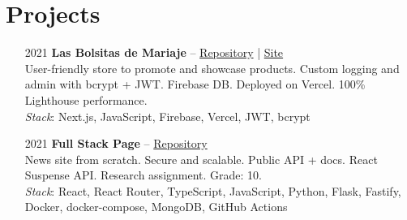 \section*{Projects}
\begin{itemize}
    \setlength\itemsep{0.3em}
    \item[2021] \textbf{Las Bolsitas de Mariaje} -- \href{https://github.com/aitorru/las-bolsitas-de-mariaje}{Repository} | \href{https://www.lasbolsitasdemariaje.es/}{Site}\\
    User-friendly store to promote and showcase products. Custom logging and admin with bcrypt + JWT. Firebase DB. Deployed on Vercel. 100\% Lighthouse performance.\\
    \emph{Stack}: Next.js, JavaScript, Firebase, Vercel, JWT, bcrypt
    \item[2021] \textbf{Full Stack Page} -- \href{https://github.com/aitorru/fullstack-page}{Repository}\\
    News site from scratch. Secure and scalable. Public API + docs. React Suspense API. Research assignment. Grade: 10.\\
    \emph{Stack}: React, React Router, TypeScript, JavaScript, Python, Flask, Fastify, Docker, docker-compose, MongoDB, GitHub Actions
\end{itemize}

